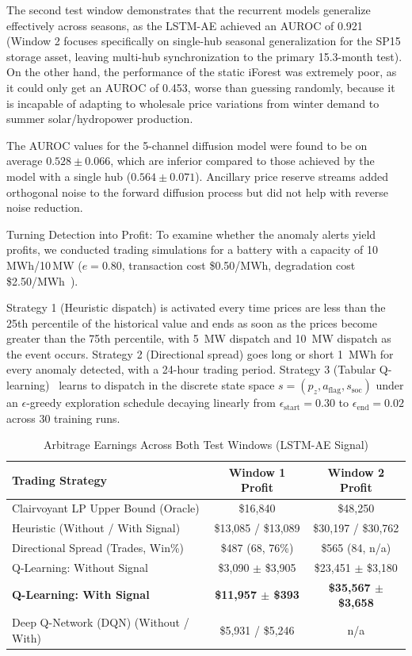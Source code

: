 \documentclass[journal]{IEEEtran}
\begin{document}
The second test window demonstrates that the recurrent models generalize effectively across seasons, as the LSTM-AE achieved an AUROC of 0.921 (Window 2 focuses specifically on single-hub seasonal generalization for the SP15 storage asset, leaving multi-hub synchronization to the primary 15.3-month test). On the other hand, the performance of the static iForest was extremely poor, as it could only get an AUROC of 0.453, worse than guessing randomly, because it is incapable of adapting to wholesale price variations from winter demand to summer solar/hydropower production.

The AUROC values for the 5-channel diffusion model were found to be on average $0.528\pm0.066$, which are inferior compared to those achieved by the model with a single hub ($0.564\pm0.071$). Ancillary price reserve streams added orthogonal noise to the forward diffusion process but did not help with reverse noise reduction.

Turning Detection into Profit: To examine whether the anomaly alerts yield profits, we conducted trading simulations for a battery with a capacity of 10\,MWh/10\,MW ($e=0.80$, transaction cost \$0.50/MWh, degradation cost \$2.50/MWh~\cite{Xu_BESS_Degradation}).

Strategy 1 (Heuristic dispatch) is activated every time prices are less than the 25th percentile of the historical value and ends as soon as the prices become greater than the 75th percentile, with 5\, MW dispatch and 10\, MW dispatch as the event occurs. Strategy 2 (Directional spread) goes long or short 1\, MWh for every anomaly detected, with a 24-hour trading period. Strategy 3 (Tabular Q-learning)~\cite{Sutton_RL} learns to dispatch in the discrete state space $s=(p_z, a_{\text{flag}}, s_{\text{soc}})$ under an $\epsilon$-greedy exploration schedule decaying linearly from $\epsilon_{\text{start}}=0.30$ to $\epsilon_{\text{end}}=0.02$ across 30 training runs.

\begin{table}[!t]
\centering
\caption{Arbitrage Earnings Across Both Test Windows (LSTM-AE Signal)}
\label{tab:economics}
\footnotesize
\renewcommand{\arraystretch}{1.15}
\setlength{\tabcolsep}{2.5pt}
\begin{tabularx}{\columnwidth}{>{\raggedright\arraybackslash}Xcc}
\toprule
\textbf{Trading Strategy} & \textbf{Window 1 Profit} & \textbf{Window 2 Profit} \\
\midrule
 Clairvoyant LP Upper Bound (Oracle) & \$16,840 & \$48,250 \\
 Heuristic (Without / With Signal) & \$13,085 / \$13,089 & \$30,197 / \$30,762 \\
 Directional Spread (Trades, Win\%) & \$487 (68, 76\%) & \$565 (84, n/a) \\
 Q-Learning: Without Signal & \$3,090 $\pm$ \$3,905 & \$23,451 $\pm$ \$3,180 \\
\textbf{Q-Learning: With Signal} & \textbf{\$11,957 $\pm$ \$393} & \textbf{\$35,567 $\pm$ \$3,658} \\
 Deep Q-Network (DQN) (Without / With) & \$5,931 / \$5,246 & n/a \\
\bottomrule
\end{tabularx}
\end{table}
\end{document}
